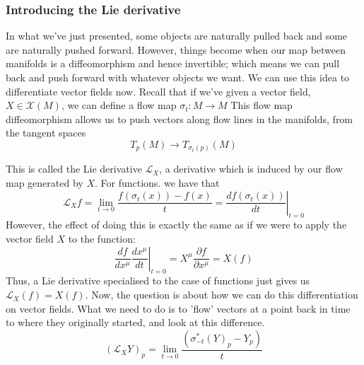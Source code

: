 \documentclass[11pt, a4paper]{article}   	%
\theoremstyle{slplain}
\begin{document}
\subsubsection{Introducing the Lie derivative} 
In what we've just presented, some objects are naturally pulled back and some are naturally pushed forward. However, things become when our map between manifolds is a diffeomorphism and hence invertible; which means we can pull back and push forward with whatever objects we want. 
We can use this idea to differentiate vector fields now. Recall that if we've given a vector field, $X \in \mathcal{X} (M )$, we can define a flow map $\sigma_t : M \rightarrow M$ This flow map diffeomorphism allows us to push vectors along flow lines in the manifolds, from the tangent spaces 
\[ 
T_p ( M ) \rightarrow T_{\sigma_t ( p )} ( M ) 
\] 

This is called the Lie derivative $\mathcal{L}_X$, a derivative which is induced by our flow map generated by $X$. For functions. we have that 
\[ 
\mathcal{L}_X f = \lim_{ t \rightarrow 0 } \frac{ f( \sigma_t ( x ))  - f( x) }{ t }  = \left. \frac{ df ( \sigma_t( x) ) }{ dt } \right\vert_{ t =0 } 
\] However, the effect of doing this is exactly the same as if we were to apply the vector field $X$ to the function: 
\[ 
\frac{ df}{ dx^\mu } \left. \frac{ dx^\mu } { dt } \right\vert_{ t = 0 }  = X^\mu \frac{ \partial f }{ \partial x^\mu }  = X( f)
\] Thus, a Lie derivative specialised to the case of functions just gives us $\mathcal{L}_X ( f)  = X( f) $. 
Now, the question is about how we can do this differentiation on vector fields. What we need to do is to 'flow' vectors at a point back in time to where they originally started, and look at this difference. 
\[ 
( \mathcal{L}_X Y )_p  = \lim_{ t \rightarrow 0 } \frac{ ( \sigma_{-t }^* (Y)_p - Y_p )  }{ t } 
\] 
\end{document}
